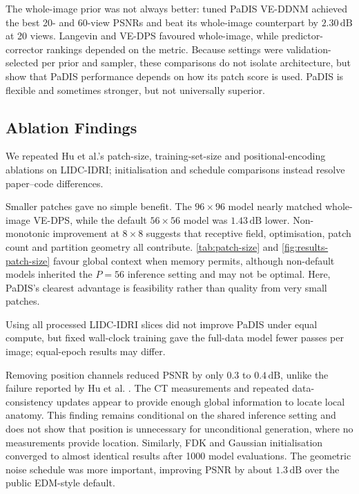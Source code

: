 The whole-image prior was not always better: tuned PaDIS VE-DDNM achieved the best 20- and 60-view PSNRs and beat its whole-image counterpart by \(2.30\,\mathrm{dB}\) at 20 views. Langevin and VE-DPS favoured whole-image, while predictor-corrector rankings depended on the metric. Because settings were validation-selected per prior and sampler, these comparisons do not isolate architecture, but show that PaDIS performance depends on how its patch score is used. PaDIS is flexible and sometimes stronger, but not universally superior.

\subsection{Ablation Findings}

We repeated Hu et al.'s patch-size, training-set-size and positional-encoding ablations \cite{hu_learning_2024} on LIDC-IDRI; initialisation and schedule comparisons instead resolve paper--code differences.

Smaller patches gave no simple benefit. The \(96\times96\) model nearly matched whole-image VE-DPS, while the default \(56\times56\) model was \(1.43\,\mathrm{dB}\) lower. Non-monotonic improvement at \(8\times8\) suggests that receptive field, optimisation, patch count and partition geometry all contribute. \autoref{tab:patch-size} and \autoref{fig:results-patch-size} favour global context when memory permits, although non-default models inherited the \(P=56\) inference setting and may not be optimal. Here, PaDIS's clearest advantage is feasibility rather than quality from very small patches.

Using all processed LIDC-IDRI slices did not improve PaDIS under equal compute, but fixed wall-clock training gave the full-data model fewer passes per image; equal-epoch results may differ.

Removing position channels reduced PSNR by only \(0.3\) to \(0.4\,\mathrm{dB}\), unlike the failure reported by Hu et al. \cite{hu_learning_2024}. The CT measurements and repeated data-consistency updates appear to provide enough global information to locate local anatomy. This finding remains conditional on the shared inference setting and does not show that position is unnecessary for unconditional generation, where no measurements provide location. Similarly, FDK and Gaussian initialisation converged to almost identical results after 1000 model evaluations. The geometric noise schedule was more important, improving PSNR by about \(1.3\,\mathrm{dB}\) over the public EDM-style default.

